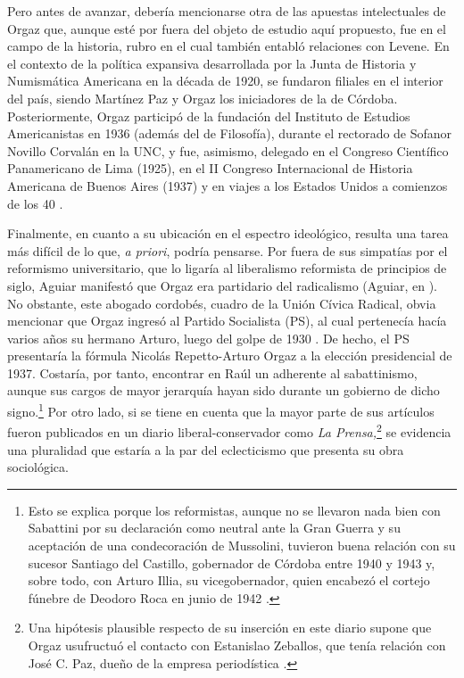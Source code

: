 Pero antes de avanzar, debería mencionarse otra de las apuestas intelectuales de Orgaz que, aunque esté por fuera del objeto de estudio aquí propuesto, fue en el campo de la historia, rubro en el cual también entabló relaciones con Levene. En el contexto de la política expansiva desarrollada por la Junta de Historia y Numismática Americana en la década de 1920, se fundaron filiales en el interior del país, siendo Martínez Paz y Orgaz los iniciadores de la de Córdoba. Posteriormente, Orgaz participó de la fundación del Instituto de Estudios Americanistas en 1936 (además del de Filosofía), durante el rectorado de Sofanor Novillo Corvalán en la UNC, y fue, asimismo, delegado en el Congreso Científico Panamericano de Lima (1925), en el II Congreso Internacional de Historia Americana de Buenos Aires (1937) y en viajes a los Estados Unidos a comienzos de los 40 \parencite{1528-REQUENA2010}.

Finalmente, en cuanto a su ubicación en el espectro ideológico, resulta una tarea más difícil de lo que, \emph{a priori}, podría pensarse. Por fuera de sus simpatías por el reformismo universitario, que lo ligaría al liberalismo reformista de principios de siglo, Aguiar manifestó que Orgaz era partidario del radicalismo (Aguiar, en \cite{1544-ORGAZ1960}). No obstante, este abogado cordobés, cuadro de la Unión Cívica Radical, obvia mencionar que Orgaz ingresó al Partido Socialista (PS), al cual pertenecía hacía varios años su hermano Arturo, luego del golpe de 1930 \parencite{1507-TCACH2012}. De hecho, el PS presentaría la fórmula Nicolás Repetto-Arturo Orgaz a la elección presidencial de 1937. Costaría, por tanto, encontrar en Raúl un adherente al sabattinismo, aunque sus cargos de mayor jerarquía hayan sido durante un gobierno de dicho signo.\footnote{Esto se explica porque los reformistas, aunque no se llevaron nada bien con Sabattini por su declaración como neutral ante la Gran Guerra y su aceptación de una condecoración de Mussolini, tuvieron buena relación con su sucesor Santiago del Castillo, gobernador de Córdoba entre 1940 y 1943 y, sobre todo, con Arturo Illia, su vicegobernador, quien encabezó el cortejo fúnebre de Deodoro Roca en junio de 1942 \parencite{1624-FERRERO1984}.} Por otro lado, si se tiene en cuenta que la mayor parte de sus artículos fueron publicados en un diario liberal-conservador como \emph{La Prensa,}\footnote{Una hipótesis plausible respecto de su inserción en este diario supone que Orgaz usufructuó el contacto con Estanislao Zeballos, que tenía relación con José C. Paz, dueño de la empresa periodística \parencite{1672-GRISENDI2011}.} se evidencia una pluralidad que estaría a la par del eclecticismo que presenta su obra sociológica.

